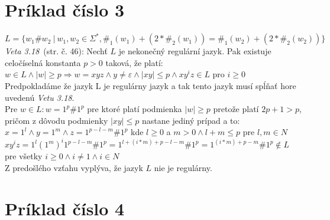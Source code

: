 \documentclass[11pt,a4paper]{article}
\begin{document}
\newpage
\section{Príklad číslo 3}
$L = \{ w_1\#w_2\ |\ w_1,w_2 \in \Sigma^*, \#_1(w_1) + (2 * \#_2(w_1)) = \#_1(w_2) + (2 * \#_2(w_2))\}$\\

\textit{Veta 3.18}~\cite{TIN}(str. č. 46): Nechť $L$ je nekonečný regulární jazyk. Pak existuje celočíselná konstanta $p>0$ taková, že platí: $w \in L \wedge |w| \geq p \Rightarrow w = xyz \wedge y \neq \varepsilon \wedge |xy| \leq p \wedge xy^iz \in L$ pro $i \geq 0$\\

Predpokladáme že jazyk L je regulárny jazyk a tak tento jazyk musí spĺňať hore uvedenú \textit{Vetu 3.18}.\\

Pre $w \in L: w=1^p\#1^p$ pre ktoré platí podmienka $|w| \geq p$ pretože platí $2p+1>p$, pričom z dôvodu podmienky $|xy| \leq p$ nastane jediný prípad a to:\\

$x=1^l \wedge y=1^m \wedge z=1^{p-l-m}\#1^p$ kde $l \geq 0$ a $m > 0 \wedge l+m \leq p$ pre $l,m \in N$\\

$xy^iz = 1^l(1^{m})^i1^{p-l-m}\#1^p = 1^{l+(i*m)+p-l-m}\#1^p = 1^{(i*m)+p-m}\#1^p \notin L$ pre všetky $i \geq 0 \wedge i \neq 1 \wedge i \in N$\\

Z predošlého vzťahu vyplýva, že jazyk $L$ nie je regulárny.




\section{Príklad číslo 4}
\end{document}
